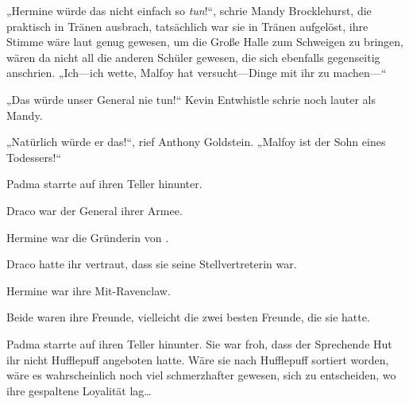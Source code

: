 „Hermine würde das nicht einfach so \emph{tun}!“, schrie Mandy Brocklehurst, die praktisch in Tränen ausbrach, tatsächlich war sie in Tränen aufgelöst, ihre Stimme wäre laut genug gewesen, um die Große Halle zum Schweigen zu bringen, wären da nicht all die anderen Schüler gewesen, die sich ebenfalls gegenseitig anschrien.
„Ich—ich wette, Malfoy hat versucht—Dinge mit ihr zu machen—“

„Das würde unser General nie tun!“ Kevin Entwhistle schrie noch lauter als Mandy.

„Natürlich würde er das!“, rief Anthony Goldstein.
„Malfoy ist der Sohn eines Todessers!“






Padma starrte auf ihren Teller hinunter.

Draco war der General ihrer Armee.

Hermine war die Gründerin von \SPHEW.

Draco hatte ihr vertraut, dass sie seine Stellvertreterin war.

Hermine war ihre Mit-Ravenclaw.

Beide waren ihre Freunde, vielleicht die zwei besten Freunde, die sie hatte.

Padma starrte auf ihren Teller hinunter. Sie war froh, dass der Sprechende Hut ihr nicht Hufflepuff angeboten hatte. Wäre sie nach Hufflepuff sortiert worden, wäre es wahrscheinlich noch viel schmerzhafter gewesen, sich zu entscheiden, wo ihre gespaltene Loyalität lag…


